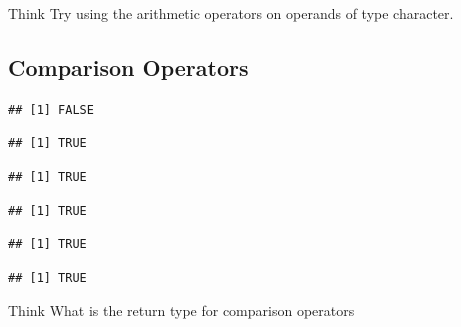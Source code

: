 \begin{DIY}{Think}
Try using the arithmetic operators on operands of type character. 
\end{DIY}

\subsection{Comparison Operators}
\begin{knitrout}
\color{fgcolor}\begin{kframe}
\begin{alltt}
 \hlopt{<}  
\end{alltt}
\begin{verbatim}
## [1] FALSE
\end{verbatim}
\begin{alltt}
 \hlopt{<=}  
\end{alltt}
\begin{verbatim}
## [1] TRUE
\end{verbatim}
\begin{alltt}
 \hlopt{>}  
\end{alltt}
\begin{verbatim}
## [1] TRUE
\end{verbatim}
\begin{alltt}
 \hlopt{>=}  
\end{alltt}
\begin{verbatim}
## [1] TRUE
\end{verbatim}
\begin{alltt}
 \hlopt{==}  
\end{alltt}
\begin{verbatim}
## [1] TRUE
\end{verbatim}
\begin{alltt}
 \hlopt{!=}  
\end{alltt}
\begin{verbatim}
## [1] TRUE
\end{verbatim}
\end{kframe}
\end{knitrout}
\begin{DIY}{Think}
What is the return type for comparison operators
\end{DIY}

